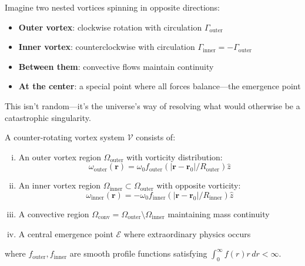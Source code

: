 \begin{intuitive}
Imagine two nested vortices spinning in opposite directions:
\begin{itemize}
\item \textbf{Outer vortex}: clockwise rotation with circulation $\Gamma_{\text{outer}}$
\item \textbf{Inner vortex}: counterclockwise with circulation $\Gamma_{\text{inner}} = -\Gamma_{\text{outer}}$
\item \textbf{Between them}: convective flows maintain continuity
\item \textbf{At the center}: a special point where all forces balance—the emergence point
\end{itemize}

This isn't random—it's the universe's way of resolving what would otherwise be a catastrophic singularity.
\end{intuitive}

\begin{definition}\label{def:counter-rotating}
A counter-rotating vortex system $\mathcal{V}$ consists of:
\begin{enumerate}[(i)]
\item An outer vortex region $\Omega_{\text{outer}}$ with vorticity distribution:
\begin{equation}
\omega_{\text{outer}}(\mathbf{r}) = \omega_0 f_{\text{outer}}(|\mathbf{r} - \mathbf{r}_0|/R_{\text{outer}}) \hat{z}
\end{equation}

\item An inner vortex region $\Omega_{\text{inner}} \subset \Omega_{\text{outer}}$ with opposite vorticity:
\begin{equation}
\omega_{\text{inner}}(\mathbf{r}) = -\omega_0 f_{\text{inner}}(|\mathbf{r} - \mathbf{r}_0|/R_{\text{inner}}) \hat{z}
\end{equation}

\item A convective region $\Omega_{\text{conv}} = \Omega_{\text{outer}} \setminus \Omega_{\text{inner}}$ maintaining mass continuity

\item A central emergence point $\mathcal{E}$ where extraordinary physics occurs
\end{enumerate}
where $f_{\text{outer}}, f_{\text{inner}}$ are smooth profile functions satisfying $\int_0^\infty f(r) r \, dr < \infty$.
\end{definition}

